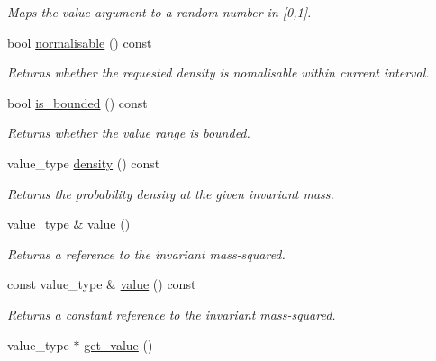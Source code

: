 \begin{DoxyCompactItemize}
\begin{DoxyCompactList}\small\item\em Maps the value argument to a random number in \mbox{[}0,1\mbox{]}. \end{DoxyCompactList}\item 
bool \hyperlink{a00577_afbf28daec2e71af8876efc05fbe9eaaa}{normalisable} () const 
\begin{DoxyCompactList}\small\item\em Returns whether the requested density is nomalisable within current interval. \end{DoxyCompactList}\item 
\hypertarget{a00577_a0d838c5abf3df69ab3059508e7bef26a}{}bool \hyperlink{a00577_a0d838c5abf3df69ab3059508e7bef26a}{is\+\_\+bounded} () const \label{a00577_a0d838c5abf3df69ab3059508e7bef26a}

\begin{DoxyCompactList}\small\item\em Returns whether the value range is bounded. \end{DoxyCompactList}\item 
\hypertarget{a00577_a5aaaa9576cac99c36e35c59be8cf1467}{}value\+\_\+type \hyperlink{a00577_a5aaaa9576cac99c36e35c59be8cf1467}{density} () const \label{a00577_a5aaaa9576cac99c36e35c59be8cf1467}

\begin{DoxyCompactList}\small\item\em Returns the probability density at the given invariant mass. \end{DoxyCompactList}\item 
\hypertarget{a00577_a68a41a29f419cbad5e3b6be783a8bfcc}{}value\+\_\+type \& \hyperlink{a00577_a68a41a29f419cbad5e3b6be783a8bfcc}{value} ()\label{a00577_a68a41a29f419cbad5e3b6be783a8bfcc}

\begin{DoxyCompactList}\small\item\em Returns a reference to the invariant mass-\/squared. \end{DoxyCompactList}\item 
\hypertarget{a00577_a2613dce4e4d8f4c5c523b488b6fc7c03}{}const value\+\_\+type \& \hyperlink{a00577_a2613dce4e4d8f4c5c523b488b6fc7c03}{value} () const \label{a00577_a2613dce4e4d8f4c5c523b488b6fc7c03}

\begin{DoxyCompactList}\small\item\em Returns a constant reference to the invariant mass-\/squared. \end{DoxyCompactList}\item 
\hypertarget{a00577_ab170e4455571bd373ee275271c777fbb}{}value\+\_\+type $\ast$ \hyperlink{a00577_ab170e4455571bd373ee275271c777fbb}{get\+\_\+value} ()\label{a00577_ab170e4455571bd373ee275271c777fbb}


\end{DoxyCompactItemize}

